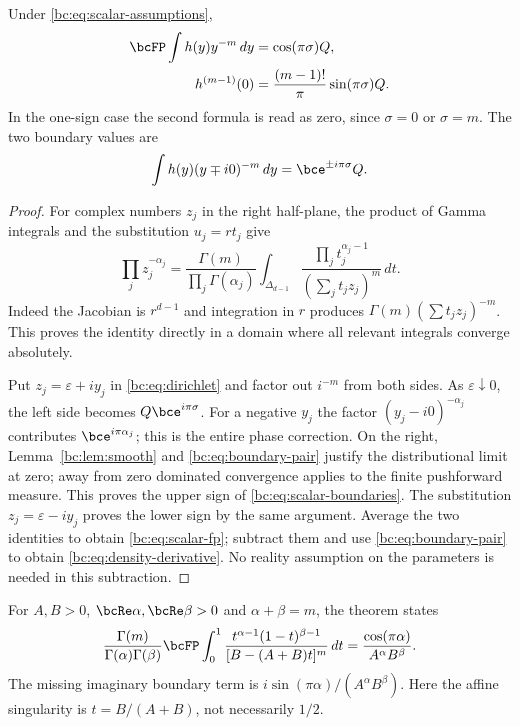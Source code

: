 \begin{theorem}\label{bc:thm:scalar}
Under \eqref{bc:eq:scalar-assumptions},
\begin{align}
 \bcFP\int h(y)y^{-m}\,dy&=\cos(\pi\sigma)Q,
       \label{bc:eq:scalar-fp}\\
 h^{(m-1)}(0)&=\frac{(m-1)!}{\pi}\sin(\pi\sigma)Q.
       \label{bc:eq:density-derivative}
\end{align}
In the one-sign case the second formula is read as zero, since
$\sigma=0$ or $\sigma=m$. The two boundary values are
\begin{equation}\label{bc:eq:scalar-boundaries}
 \int h(y)(y\mp i0)^{-m}\,dy=\bce^{\pm i\pi\sigma}Q.
\end{equation}
\end{theorem}
\begin{proof}
For complex numbers $z_j$ in the right half-plane, the product of Gamma
integrals and the substitution $u_j=rt_j$ give
\begin{equation}\label{bc:eq:dirichlet}
 \prod_j z_j^{-\alpha_j}
 =\frac{\Gamma(m)}{\prod_j\Gamma(\alpha_j)}
 \int_{\Delta_{d-1}}\frac{\prod_jt_j^{\alpha_j-1}}
                              {(\sum_jt_jz_j)^m}\,dt.
\end{equation}
Indeed the Jacobian is $r^{d-1}$ and integration in $r$ produces
$\Gamma(m)(\sum t_jz_j)^{-m}$. This proves the identity directly in a
domain where all relevant integrals converge absolutely.

Put $z_j=\varepsilon+i y_j$ in \eqref{bc:eq:dirichlet} and factor out
$i^{-m}$ from both sides. As $\varepsilon\downarrow0$, the left side
becomes $Q\bce^{i\pi\sigma}$. For a negative $y_j$ the factor
$(y_j-i0)^{-\alpha_j}$ contributes $\bce^{i\pi\alpha_j}$; this is the
entire phase correction. On the right, Lemma~\ref{bc:lem:smooth} and
\eqref{bc:eq:boundary-pair} justify the distributional limit at zero;
away from zero dominated convergence applies to the finite pushforward
measure. This proves the upper sign of
\eqref{bc:eq:scalar-boundaries}. The substitution
$z_j=\varepsilon-i y_j$ proves the lower sign by the same argument.
Average the two identities to obtain \eqref{bc:eq:scalar-fp}; subtract
them and use \eqref{bc:eq:boundary-pair} to obtain
\eqref{bc:eq:density-derivative}. No reality assumption on the parameters
is needed in this subtraction.
\end{proof}

\begin{remark}
For $A,B>0$, $\bcRe\alpha,\bcRe\beta>0$ and $\alpha+\beta=m$, the theorem
states
\begin{equation}\label{bc:eq:two-beta}
 \frac{\Gamma(m)}{\Gamma(\alpha)\Gamma(\beta)}
 \bcFP\int_0^1
 \frac{t^{\alpha-1}(1-t)^{\beta-1}}
      {[B-(A+B)t]^m}\,dt
 =\frac{\cos(\pi\alpha)}{A^\alpha B^\beta}.
\end{equation}
The missing imaginary boundary term is
$i\sin(\pi\alpha)/(A^\alpha B^\beta)$. Here the affine singularity is
$t=B/(A+B)$, not necessarily $1/2$.
\end{remark}


